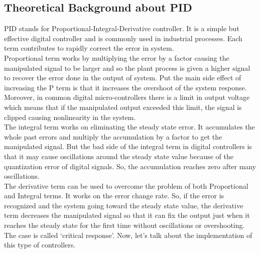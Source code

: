\documentclass[12pt]{book}
\begin{document}
	\subsection{Theoretical Background about PID}
	PID stands for Proportional-Integral-Derivative controller. It is a simple but effective digital controller and is commonly used in industrial processes. Each term contributes to rapidly correct the error in system. \\
	Proportional term works by multiplying the error by a factor causing the manipulated signal to be larger and so the plant process is given a higher signal to recover the error done in the output of system. Put the main side effect of increasing the P term is that it increases the overshoot of the system response. Moreover, in common digital micro-controllers there is a limit in output voltage which means that if the manipulated output exceeded this limit, the signal is clipped causing nonlinearity in the system.\\ 
	The integral term works on eliminating the steady state error. It accumulates the whole past errors and multiply the accumulation by a factor to get the manipulated signal. But the bad side of the integral term in digital controllers is that it may cause oscillations around the steady state value because of the quantization error of digital signals. So, the accumulation reaches zero after many oscillations.\\
	The derivative term can be used to overcome the problem of both Proportional and Integral terms. It works on the error change rate. So, if the error is recognized and the system going toward the steady state value, the derivative term decreases the manipulated signal so that it can fix the output just when it reaches the steady state for the first time without oscillations or overshooting. The case is called ‘critical response’. Now, let’s talk about the implementation of this type of controllers.
	
	
\end{document}
